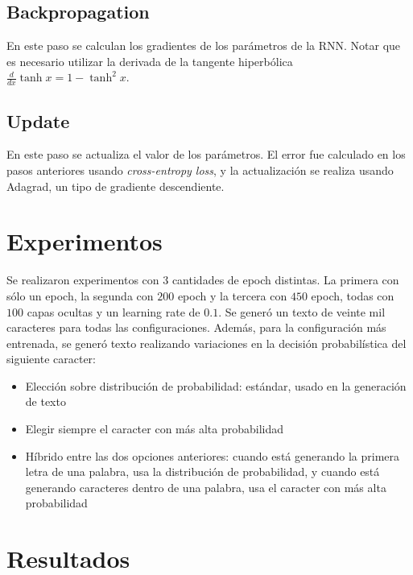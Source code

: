 \documentclass[11pt,letterpaper]{article}
\begin{document}
\subsection{Backpropagation}
En este paso se calculan los gradientes de los parámetros de la RNN. Notar que es necesario 
utilizar la derivada de la tangente hiperbólica $\frac{d}{dx}\tanh x = 1 - \tanh^2 x$.

\subsection{Update}
En este paso se actualiza el valor de los parámetros. El error fue calculado en los pasos anteriores 
usando \textit{cross-entropy loss}, y la actualización se realiza usando Adagrad, un tipo de gradiente 
descendiente.

\section{Experimentos}
Se realizaron experimentos con 3 cantidades de epoch distintas. La primera con sólo un epoch, 
la segunda con $200$ epoch y la tercera con $450$ epoch, todas con $100$ capas ocultas y un learning 
rate de $0.1$. Se generó un texto de veinte mil caracteres para todas las configuraciones. Además, para 
la configuración más entrenada, se generó texto realizando variaciones en la decisión probabilística 
del siguiente caracter:

\begin{itemize}
	\item Elección sobre distribución de probabilidad: estándar, usado en la generación de texto
	\item Elegir siempre el caracter con más alta probabilidad
	\item Híbrido entre las dos opciones anteriores: cuando está generando la primera letra de una 
		palabra, usa la distribución de probabilidad, y cuando está generando caracteres 
		dentro de una palabra, usa el caracter con más alta probabilidad
\end{itemize}


\section{Resultados}
\end{document}
